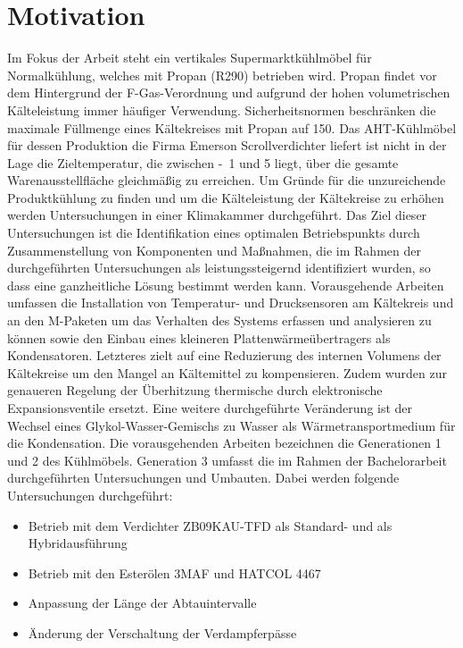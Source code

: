 
\chapter{Motivation}
\label{cha:Motivation}

Im Fokus der Arbeit steht ein vertikales Supermarktkühlmöbel für Normalkühlung, welches mit Propan (R290) betrieben wird\cite{DINDeutschesInstitutfurNormunge.V..b}. Propan findet vor dem Hintergrund der F-Gas-Verordnung und aufgrund der hohen volumetrischen Kälteleistung immer häufiger Verwendung\cite{EUParlamentRat.2006}\cite{Huber.2016}. Sicherheitsnormen beschränken die maximale Füllmenge eines Kältekreises mit Propan auf \unit{150}{\gram}\cite{DINDeutschesInstitutfurNormunge.V..2014b}. Das AHT-Kühlmöbel für dessen Produktion die Firma Emerson Scrollverdichter liefert ist nicht in der Lage die Zieltemperatur, die zwischen \unit{-1}{\celsius} und \unit{5}{\celsius} liegt, über die gesamte Warenausstellfläche gleichmäßig zu erreichen. Um Gründe für die unzureichende Produktkühlung zu finden und um die Kälteleistung der Kältekreise zu erhöhen werden Untersuchungen in einer Klimakammer durchgeführt. Das Ziel dieser Untersuchungen ist die Identifikation eines optimalen Betriebspunkts durch Zusammenstellung von Komponenten und Maßnahmen, die im Rahmen der durchgeführten Untersuchungen als leistungssteigernd identifiziert wurden, so dass eine ganzheitliche Lösung bestimmt werden kann. 
Vorausgehende Arbeiten umfassen die Installation von Temperatur- und Drucksensoren am Kältekreis und an den M-Paketen um das Verhalten des Systems erfassen und analysieren zu können sowie den Einbau eines kleineren Plattenwärmeübertragers als Kondensatoren. Letzteres zielt auf eine Reduzierung des internen Volumens der Kältekreise um den Mangel an Kältemittel zu kompensieren. Zudem wurden zur genaueren Regelung der Überhitzung thermische durch elektronische Expansionsventile ersetzt. Eine weitere durchgeführte Veränderung ist der Wechsel eines Glykol-Wasser-Gemischs zu Wasser als Wärmetransportmedium für die Kondensation.
Die vorausgehenden Arbeiten bezeichnen die Generationen 1 und 2 des Kühlmöbels.
Generation 3 umfasst die im Rahmen der Bachelorarbeit durchgeführten Untersuchungen und Umbauten.
Dabei werden folgende Untersuchungen durchgeführt:

\begin{itemize} 
\item Betrieb mit dem Verdichter ZB09KAU-TFD als Standard- und als Hybridausführung
\item Betrieb mit den Esterölen 3MAF und HATCOL 4467
\item Anpassung der Länge der Abtauintervalle
\item Änderung der Verschaltung der Verdampferpässe
\end{itemize}

